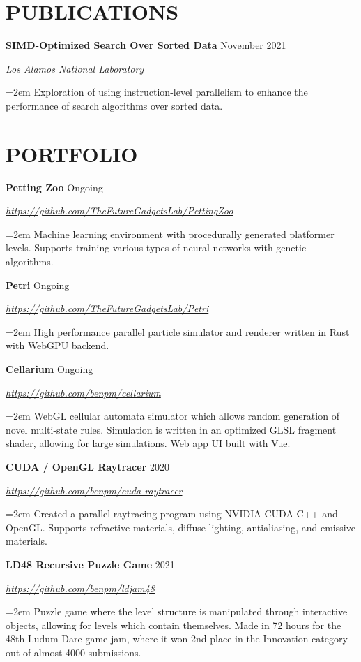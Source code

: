 \documentclass[paper=a4,fontsize=11pt]{scrartcl} %
\newcommand{\sepspace}{\vspace*{1em}}		%
\newcommand{\sym}{\raisebox{1pt}{$\blacktriangleright$}}
\newcommand{\showurl}[1]{\href{#1}{#1}}
\newcommand{\NewPart}[1]{\section*{\sym \mbox{} \MakeUppercase{#1}}}
\newcommand{\EducationEntry}[5]{
		\Large \noindent \textbf{#1} \hfill \\   %
		\normalsize \noindent \textit{#2} \hfill	  %
		\colorbox{yel}{\color{blk}#3} \par  %
		\noindent \textit{#4} \par        %
		\noindent\hangindent=2em\hangafter=0 \small #5 %
		\normalsize \par
		\sepspace}
\newcommand{\WorkEntry}[4]{				  %
		\noindent \textbf{#1} \hfill      %
		\colorbox{yel}{\color{blk}#2} \par  %
		\noindent \textit{#3} \par              %
		\noindent\hangindent=2em\hangafter=0 \small #4 %
		\normalsize \par
		\sepspace}
\begin{document}


\NewPart{Publications}{}

\WorkEntry{\href{https://asmedigitalcollection.asme.org/computingengineering/article-abstract/22/2/021009/1121736/simd-Optimized-Search-Over-Sorted-Data}{SIMD-Optimized Search Over Sorted Data}}
	{November 2021}{Los Alamos National Laboratory}
	{Exploration of using instruction-level parallelism to enhance the performance of search algorithms over sorted data.}



\pagebreak

\NewPart{Portfolio}{}

\WorkEntry{Petting Zoo}{Ongoing}{\showurl{https://github.com/TheFutureGadgetsLab/PettingZoo}}{
	Machine learning environment with procedurally generated platformer levels.
	Supports training various types of neural networks with genetic algorithms.
}

\WorkEntry{Petri}{Ongoing}{\showurl{https://github.com/TheFutureGadgetsLab/Petri}}{
	High performance parallel particle simulator and renderer written in Rust with WebGPU backend.
}

\WorkEntry{Cellarium}{Ongoing}{\showurl{https://github.com/benpm/cellarium}}{
	WebGL cellular automata simulator which allows random generation of novel multi-state rules.
	Simulation is written in an optimized GLSL fragment shader, allowing for large simulations.
	Web app UI built with Vue.
}

\WorkEntry{CUDA / OpenGL Raytracer}{2020}{\showurl{https://github.com/benpm/cuda-raytracer}}{
	Created a parallel raytracing program using NVIDIA CUDA C++ and OpenGL.
	Supports refractive materials, diffuse lighting, antialiasing, and emissive materials.
}

\WorkEntry{LD48 Recursive Puzzle Game}{2021}{\showurl{https://github.com/benpm/ldjam48}}{
	Puzzle game where the level structure is manipulated through interactive objects,
	allowing for levels which contain themselves.
	Made in 72 hours for the 48th Ludum Dare game jam, where it won 2nd place in the Innovation category
	out of almost 4000 submissions.
}
\end{document}
